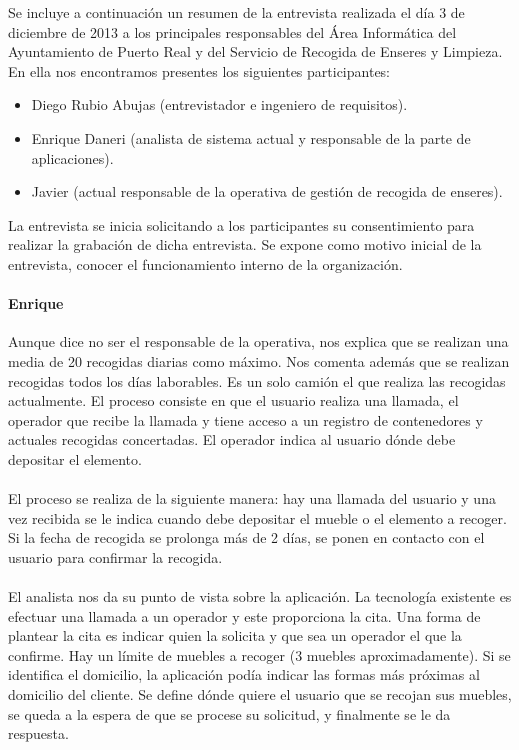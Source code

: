 Se incluye a continuación un resumen de la entrevista realizada el día 3 de diciembre de 2013 a los principales responsables del Área Informática del Ayuntamiento de Puerto Real y del Servicio de Recogida de Enseres y Limpieza. En ella nos encontramos presentes los siguientes participantes:
\begin{itemize}
\item Diego Rubio Abujas (entrevistador e ingeniero de requisitos).
\item Enrique Daneri (analista de sistema actual y responsable de la parte de aplicaciones).
\item Javier (actual responsable de la operativa de gestión de recogida de enseres).
\end{itemize}
 
La entrevista se inicia solicitando a los participantes su consentimiento para realizar la grabación de dicha entrevista. Se expone como motivo inicial de la entrevista, conocer el funcionamiento interno de la organización.
 
 
\paragraph{Enrique} Aunque dice no ser el responsable de la operativa, nos explica que se realizan una media de 20 recogidas diarias como máximo.  Nos comenta además que se realizan recogidas todos los días laborables. Es un solo camión el que realiza las recogidas actualmente. El proceso consiste en que el usuario realiza una llamada, el operador que recibe la llamada y tiene acceso a un registro de contenedores y actuales recogidas concertadas. El operador indica al usuario dónde debe depositar el elemento.  
\paragraph{} El proceso se realiza de la siguiente manera: hay una llamada del usuario y una vez recibida se le indica cuando debe depositar el mueble o el elemento a recoger. Si la fecha de recogida se prolonga más de 2 días, se ponen en contacto con el usuario para confirmar la recogida. 

\paragraph{}El analista nos da su punto de vista sobre la aplicación. La tecnología existente es efectuar una llamada a un operador y este proporciona la cita. Una forma de plantear la cita es indicar quien la solicita y que sea un operador el que la confirme. Hay un límite de muebles a recoger (3 muebles aproximadamente). Si se identifica el domicilio, la aplicación podía indicar las formas más próximas al domicilio del cliente. Se define dónde quiere el usuario que se recojan sus muebles, se queda a la espera de que se procese su solicitud, y finalmente se le da respuesta. 
 
